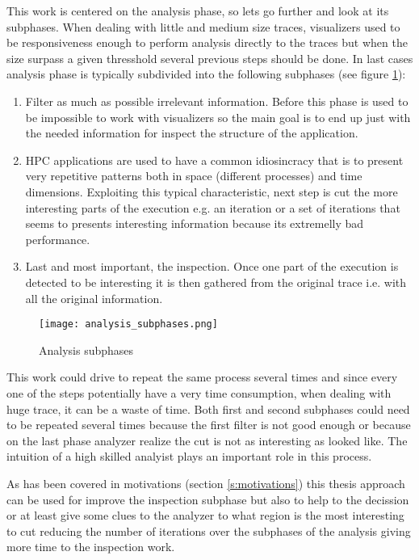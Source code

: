 This work is centered on the analysis phase, so lets go further and look at its
subphases. When dealing with little and medium size traces, visualizers used to
be responsiveness enough to perform analysis directly to the traces but when the 
size surpass a given thresshold several previous steps should be done. In last 
cases analysis phase is typically subdivided into the following 
subphases (see figure \ref{fig:analysis_subphases}):
\begin{enumerate}[label=\roman*)]
  \item Filter as much as possible irrelevant information. Before this phase is
    used to be impossible to work with visualizers so the main goal is to end up
    just with the needed information for inspect the structure of the
    application.
  \item HPC applications are used to have a common idiosincracy that is to
    present very repetitive patterns both in space (different processes) and 
    time dimensions. Exploiting this typical characteristic, next step is cut
    the more interesting parts of the execution e.g. an iteration or a set of
    iterations that seems to presents interesting information because its 
    extremelly bad performance.
  \item Last and most important, the inspection. Once one part of the execution is
    detected to be interesting it is then gathered from the original trace i.e.
    with all the original information.
\end{enumerate}

\begin{figure}[]
  \centering
  \texttt{[image: analysis\_subphases.png]}
  \caption{Analysis subphases}
  \label{fig:analysis_subphases}
\end{figure}

This work could drive to repeat the same process several times and since every 
one of the steps potentially have a very time consumption, when dealing with
huge trace, it can be a waste of time. 
Both first and second subphases could need to be repeated several times because 
the first filter is not good enough or because on the last phase analyzer realize 
the cut is not as interesting as looked like. The intuition of a high skilled
analyist plays an important role in this process.

As has been covered in motivations (section \ref{s:motivations}) this thesis
approach can be used for improve the inspection subphase but also to help to the
decission or at least give some clues to the analyzer to what region is the most
interesting to cut reducing the number of iterations over the subphases of the
analysis giving more time to the inspection work.

